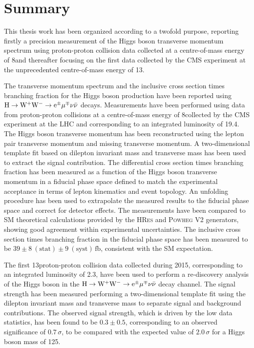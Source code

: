 \chapter*{Summary}
\thispagestyle{empty}

This thesis work has been organized according to a twofold purpose, reporting firstly a precision measurement of the Higgs boson transverse momentum spectrum using proton-proton collision data collected at a centre-of-mass energy of 8\TeV and thereafter focusing on the first data collected by the CMS experiment at the unprecedented centre-of-mass energy of 13\TeV.

The transverse momentum spectrum and the inclusive cross section times branching fraction for the Higgs boson production have been reported using $\rm{H}\to\rm{W^+W^-}\to e^{\pm} \mu^{\mp}\nu\bar{\nu}$ decays. Measurements have been performed using data from proton-proton collisions at a centre-of-mass energy of 8\TeV collected by the CMS experiment at the LHC and corresponding to an integrated luminosity of 19.4\ifb. The Higgs boson transverse momentum has been reconstructed using the lepton pair transverse momentum and missing transverse momentum. A two-dimensional template fit based on dilepton invariant mass and transverse mass has been used to extract the signal contribution. The differential cross section times branching fraction has been measured as a function of the Higgs boson transverse momentum in a fiducial phase space defined to match the experimental acceptance in terms of lepton kinematics and event topology. An unfolding procedure has been used to extrapolate the measured results to the fiducial phase space and correct for detector effects.
The measurements have been compared to SM theoretical calculations provided by the \textsc{HRes} and \textsc{Powheg V2} generators, showing good agreement within experimental uncertainties. The inclusive cross section times branching fraction in the fiducial phase space has been measured to be $39\pm 8~(\mathrm{stat}) \pm 9~(\mathrm{syst})\,\mathrm{fb}$, consistent with the SM expectation.

The first 13\TeV proton-proton collision data collected during 2015, corresponding to an integrated luminosity of 2.3\ifb, have been used to perform a re-discovery analysis of the Higgs boson in the $\rm{H}\to\rm{W^+W^-}\to e^{\pm} \mu^{\mp}\nu\bar{\nu}$ decay channel. The signal strength has been measured performing a two-dimensional template fit using the dilepton invariant mass and transverse mass to separate signal and background contributions.
The observed signal strength, which is driven by the low data statistics, has been found to be $0.3\pm0.5$, corresponding to an observed significance of $0.7\,\sigma$, to be compared with the expected value of $2.0\,\sigma$ for a Higgs boson mass of 125\GeV.

